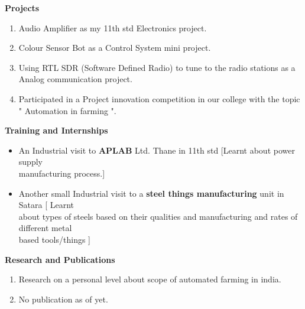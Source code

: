 \documentclass[12pt]{article}
\begin{document}
\begin{flushleft}
\vspace{8mm} 
\textbf{Projects}\\
\begin{enumerate}
	\item Audio Amplifier as my 11th std Electronics project.
	\item Colour Sensor Bot as a Control System mini project.
	\item Using RTL SDR (Software Defined Radio) to tune to the radio stations as a Analog communication project.
	\item Participated in a Project innovation competition in our college with the topic " Automation in farming ".
	
\end{enumerate}

\vspace{30mm} 
\textbf{Training and Internships}
\begin{itemize}
	\item An Industrial visit to \textbf{APLAB} Ltd. Thane in 11th std [Learnt about power supply \\manufacturing process.]
	\item Another small Industrial visit to a \textbf{steel things manufacturing} unit in Satara [ Learnt \\about types of steels based on their qualities and manufacturing and rates of different metal \\based tools/things ]
\end{itemize}

\vspace{5mm}
\textbf{Research and Publications}\\
\vspace{7mm}
\begin{enumerate}
	\item Research on a personal level about scope of automated farming in india.
	\item No publication as of yet.
\end{enumerate}


\end{flushleft}
\end{document}
